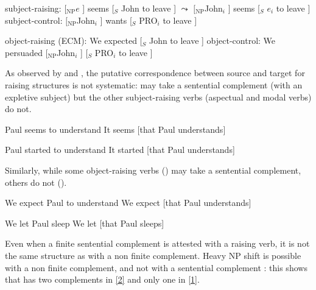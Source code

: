\documentclass[output=paper]{langsci/langscibook}
\begin{document}
\begin{exe}
\ex  \begin{xlist}
\ex 	subject-raising: $[$$_{\text{NP}}$$e$ ] seems [$_{S}$ John to leave ] 
$\leadsto$  
$[$$_{\text{NP}}$John$_{i}$ ] seems [$_{S}$ $e_{i}$ to leave ]	
\ex subject-control:  
$[$$_{\text{NP}}$John$_{i}$ ] wants [$_{S}$ PRO$_{i}$ to leave ]	
 \end{xlist}
 \end{exe}

\begin{exe}
\ex  \begin{xlist}
\ex 	object-raising (ECM): We expected [$_{S}$ John to leave ] 	
\ex object-control: We persuaded  
$[$$_{\text{NP}}$John$_{i}$ ]  [$_{S}$ PRO$_{i}$ to leave ]	
 \end{xlist}
 \end{exe}

 As observed by \citet{Bresnan1982} and \citet{SagandPollard1991}, the putative correspondence between source and target for raising structures is not systematic:  may take a sentential complement (with an expletive subject) but the other subject-raising verbs (aspectual and modal verbs) do not. 


\begin{exe}
\ex \begin{xlist}
\ex  Paul seems to understand
\ex It seems [that Paul understands]	
\end{xlist}
\ex \begin{xlist}
 	\ex Paul started to understand
 	\ex *It started [that Paul understands]
 \end{xlist}
 \end{exe}
 
 Similarly, while some object-raising verbs () may take a sentential complement, others do not ().
 
 \begin{exe}
\ex \begin{xlist}
\ex We expect Paul to understand	\label{2}
\ex We expect [that Paul understands] \label{1}
\end{xlist}
\ex \begin{xlist}
\ex We let Paul sleep
\ex * We let [that Paul sleeps]
\end{xlist}	
\end{exe}

Even when a finite sentential complement is attested with a raising verb, it is not the same structure as  with a non finite complement. Heavy NP shift is possible with a non finite complement, and not with a sentential complement \citet{Bresnan1982}: this shows that  has two complements in \ref{2} and only one in \ref{1}.
\end{document}
